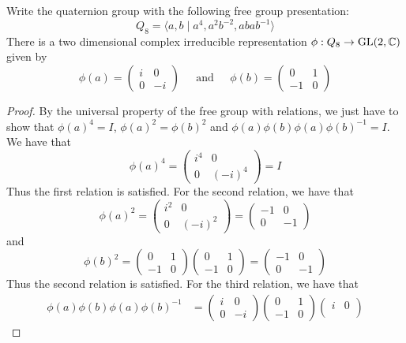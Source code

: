 \documentclass[a4paper]{article}
\begin{document}
\begin{prp}{}{} Write the quaternion group with the following free group presentation: $$Q_8=\langle a,b\;|\;a^4,a^2b^{-2},abab^{-1}\rangle$$ There is a two dimensional complex irreducible representation $\phi:Q_8\to\text{GL}(2,\mathbb{C})$ given by $$\phi(a)=\begin{pmatrix}
i & 0\\
0 & -i
\end{pmatrix}\;\;\;\;\text{ and }\;\;\;\;\phi(b)=\begin{pmatrix}
0 & 1\\
-1 & 0
\end{pmatrix}$$ \tcbline
\begin{proof}
By the universal property of the free group with relations, we just have to show that $\phi(a)^4=I$, $\phi(a)^2=\phi(b)^2$ and $\phi(a)\phi(b)\phi(a)\phi(b)^{-1}=I$. We have that $$\phi(a)^4=\begin{pmatrix}
i^4 & 0\\
0 & (-i)^4
\end{pmatrix}=I$$ Thus the first relation is satisfied. For the second relation, we have that $$
\phi(a)^2=\begin{pmatrix}
i^2 & 0\\
0 & (-i)^2
\end{pmatrix}=\begin{pmatrix}
-1 & 0\\
0 & -1
\end{pmatrix}$$ and $$\phi(b)^2=\begin{pmatrix}
0 & 1\\
-1 & 0
\end{pmatrix}\begin{pmatrix}
0 & 1\\
-1 & 0
\end{pmatrix}=\begin{pmatrix}
-1 & 0\\
0 & -1
\end{pmatrix}$$ Thus the second relation is satisfied. For the third relation, we have that 
\begin{align*}
\phi(a)\phi(b)\phi(a)\phi(b)^{-1}&=\begin{pmatrix}
i & 0\\
0 & -i
\end{pmatrix}\begin{pmatrix}
0 & 1\\
-1 & 0
\end{pmatrix}\begin{pmatrix}
i & 0\\

\end{pmatrix}
\end{align*}
\end{proof}
\end{prp}
\end{document}
